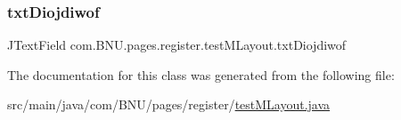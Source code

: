 \subsubsection{\texorpdfstring{txt\+Diojdiwof}{txtDiojdiwof}}
{\footnotesize\ttfamily J\+Text\+Field com.\+B\+N\+U.\+pages.\+register.\+test\+M\+Layout.\+txt\+Diojdiwof\hspace{0.3cm}{\ttfamily [private]}}



The documentation for this class was generated from the following file\+:\begin{DoxyCompactItemize}
\item 
src/main/java/com/\+B\+N\+U/pages/register/\mbox{\hyperlink{test_m_layout_8java}{test\+M\+Layout.\+java}}\end{DoxyCompactItemize}
